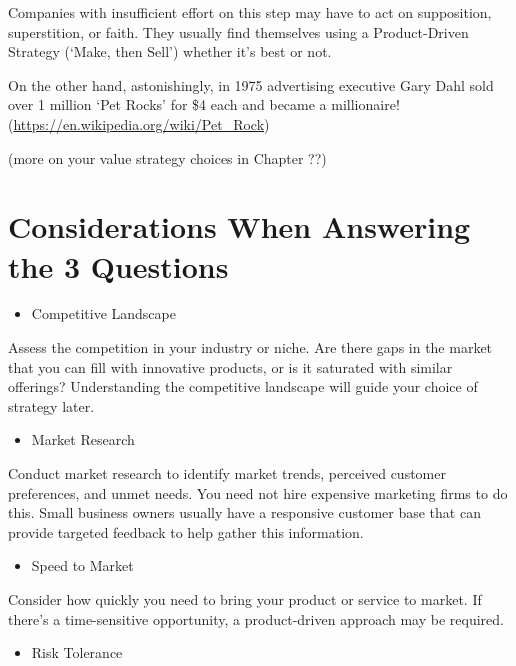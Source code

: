 \documentclass[
]{book}
\providecommand{\tightlist}{%
  \setlength{\itemsep}{0pt}\setlength{\parskip}{0pt}}
\begin{document}
Companies with insufficient effort on this step may have to act on supposition, superstition, or faith. They usually find themselves using a Product-Driven Strategy ({`Make, then Sell'}) whether it's best or not.

On the other hand, astonishingly, in 1975 advertising executive Gary Dahl sold over 1 million `Pet Rocks' for \$4 each and became a millionaire! (\url{https://en.wikipedia.org/wiki/Pet_Rock})

(more on your value strategy choices in Chapter ??)

\hypertarget{considerations-when-answering-the-3-questions}{%
\section{Considerations When Answering the 3 Questions}\label{considerations-when-answering-the-3-questions}}

\begin{itemize}
\tightlist
\item
  Competitive Landscape
\end{itemize}

Assess the competition in your industry or niche. Are there gaps in the market that you can fill with innovative products, or is it saturated with similar offerings? Understanding the competitive landscape will guide your choice of strategy later.

\begin{itemize}
\tightlist
\item
  Market Research
\end{itemize}

Conduct market research to identify market trends, perceived customer preferences, and unmet needs. You need not hire expensive marketing firms to do this. Small business owners usually have a responsive customer base that can provide targeted feedback to help gather this information.

\begin{itemize}
\tightlist
\item
  Speed to Market
\end{itemize}

Consider how quickly you need to bring your product or service to market. If there's a time-sensitive opportunity, a product-driven approach may be required.

\begin{itemize}
\tightlist
\item
  Risk Tolerance
\end{itemize}
\end{document}
